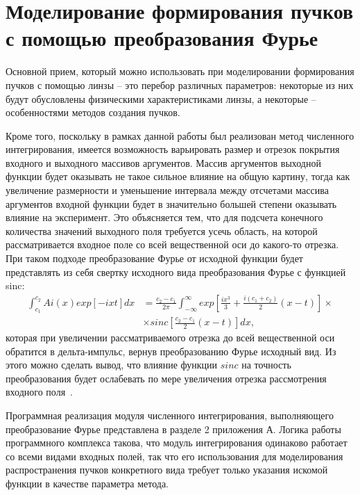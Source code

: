     \section{\nohyphens{Моделирование формирования пучков с помощью преобразования Фурье}}{
    Основной прием, который можно использовать при моделировании
    формирования пучков с помощью линзы – это перебор различных параметров:
    некоторые из них будут обусловлены физическими характеристиками линзы, а
    некоторые – особенностями методов создания пучков.

    Кроме того, поскольку в рамках данной работы был реализован метод
    численного интегрирования, имеется возможность варьировать размер и отрезок покрытия
    входного и выходного массивов аргументов. Массив аргументов выходной
    функции будет оказывать не такое сильное влияние на общую картину, тогда
    как увеличение размерности и уменьшение интервала между отсчетами массива
    аргументов входной функции будет в значительно большей степени оказывать
    влияние на эксперимент. Это объясняется тем, что для подсчета конечного
    количества значений выходного поля требуется усечь область, на которой
    рассматривается входное поле со всей вещественной оси до какого-то отрезка.
    При таком подходе преобразование Фурье от исходной функции будет
    представлять из себя свертку исходного вида преобразования Фурье с
    функцией sinc:
    \begin{align*}
        \int^{c_2}_{c_1} Ai(x)exp[-ixt]dx &= \frac{c_2-c_1}{2\pi}\int^{\infty}_{-\infty}exp[\frac{ix^3}{3} + \frac{i(c_1+c_2)}{2}(x-t)] \times\\
        & \times sinc[\frac{c_2-c_1}{2}(x-t)]dx,
    \end{align*}
    которая при увеличении рассматриваемого отрезка до всей
    вещественной оси обратится в дельта-импульс, вернув преобразованию Фурье
    исходный вид. Из этого можно сделать вывод, что влияние функции $sinc$ на
    точность преобразования будет ослабевать по мере увеличения отрезка
    рассмотрения входного поля~\cite{Khonina_2011}.

    Программная реализация модуля численного интегрирования,
    выполняющего преобразование Фурье представлена в разделе 2 приложения А. Логика
    работы программного комплекса такова, что модуль интегрирования одинаково
    работает со всеми видами входных полей, так что его использования для
    моделирования распространения пучков конкретного вида требует только
    указания искомой функции в качестве параметра метода.

}
